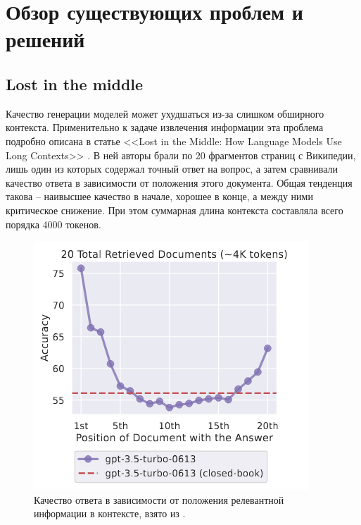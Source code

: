 \section{Обзор существующих проблем и решений}
\label{Solution} 

\subsection{Lost in the middle}
\label{subsec:lost_in_the_middle} 

Качество генерации моделей может ухудшаться из-за слишком обширного контекста. Применительно к задаче извлечения информации эта проблема подробно описана в статье <<Lost in the Middle: How Language Models Use Long Contexts>> \cite{lost_in_the_middle}. В ней авторы брали по 20 фрагментов страниц с Википедии, лишь один из которых содержал точный ответ на вопрос, а затем сравнивали качество ответа в зависимости от положения этого документа. Общая тенденция такова -- наивысшее качество в начале, хорошее в конце, а между ними критическое снижение. При этом суммарная длина контекста составляла всего порядка 4000 токенов.

\begin{figure}[h!]
    \centering
    \includegraphics[scale=0.9]{images/Lost_in_the_middle.png}
    \caption{Качество ответа в зависимости от положения релевантной информации в контексте, взято из \cite{lost_in_the_middle}.}
\end{figure}


